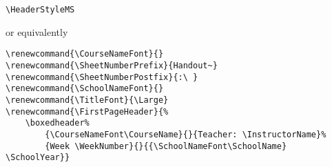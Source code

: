 \documentclass[12pt,twoside,parskip,notitle,showframe]{handout}
\begin{document}
\newpage

\begingroup
\HeaderStyleMS
\maketitle
\verb|\HeaderStyleMS|

or equivalently

\begin{verbatim}
\renewcommand{\CourseNameFont}{}
\renewcommand{\SheetNumberPrefix}{Handout~}
\renewcommand{\SheetNumberPostfix}{:\ }
\renewcommand{\SchoolNameFont}{}
\renewcommand{\TitleFont}{\Large}
\renewcommand{\FirstPageHeader}{%
    \boxedheader%
        {\CourseNameFont\CourseName}{}{Teacher: \InstructorName}%
        {Week \WeekNumber}{}{{\SchoolNameFont\SchoolName} \SchoolYear}}
\end{verbatim}
\endgroup
\end{document}
